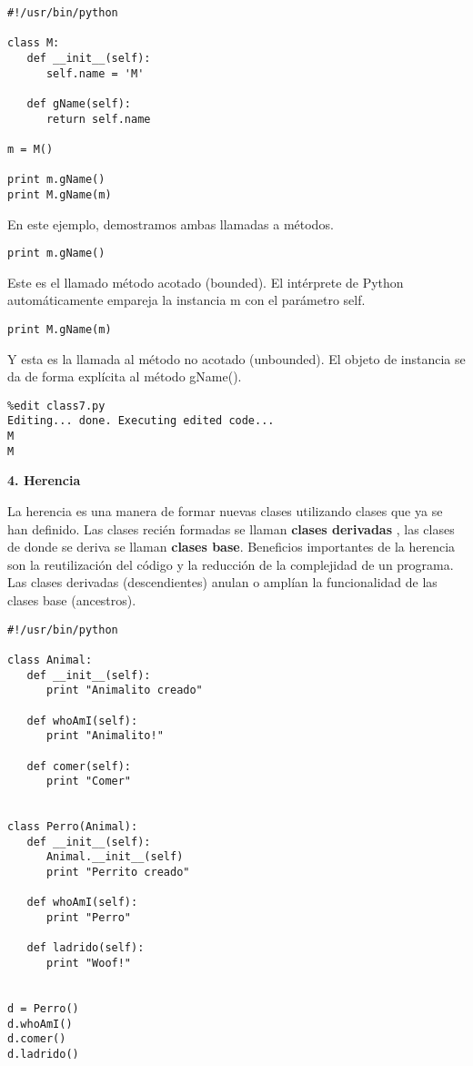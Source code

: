 \documentclass[twoside,10.5pt]{article}%
\begin{document}
\begin{verbatim}
#!/usr/bin/python

class M:
   def __init__(self):
      self.name = 'M'

   def gName(self):
      return self.name
      
m = M()

print m.gName()
print M.gName(m)
\end{verbatim}

En este ejemplo, demostramos ambas llamadas a m\'etodos.

\begin{verbatim}
print m.gName()
\end{verbatim}

Este es el llamado m\'etodo  acotado (bounded). El int\'erprete de Python  autom\'aticamente empareja  la instancia  m con el par\'ametro self.

\begin{verbatim}
print M.gName(m)
\end{verbatim}

Y esta es la llamada al m\'etodo no acotado (unbounded). El objeto de instancia se da de forma expl\'icita al m\'etodo gName().

\begin{verbatim}
%edit class7.py
Editing... done. Executing edited code...
M
M
\end{verbatim}

\textbf{4. Herencia}

La herencia es una manera de formar nuevas clases utilizando clases que ya se han definido. Las clases reci\'en formadas se llaman \textbf{clases derivadas} , las clases de donde se deriva se llaman  \textbf{clases base}. Beneficios importantes de la herencia son la reutilizaci\'on del código y la reducci\'on de la complejidad de un programa. Las clases derivadas (descendientes) anulan o ampl\'ian la funcionalidad de las clases base (ancestros).

\begin{verbatim}
#!/usr/bin/python

class Animal:
   def __init__(self):
      print "Animalito creado"

   def whoAmI(self):
      print "Animalito!"

   def comer(self):
      print "Comer"


class Perro(Animal):
   def __init__(self):
      Animal.__init__(self)
      print "Perrito creado"

   def whoAmI(self):
      print "Perro"

   def ladrido(self):
      print "Woof!"


d = Perro()
d.whoAmI()
d.comer()
d.ladrido()
\end{verbatim}
\end{document}
